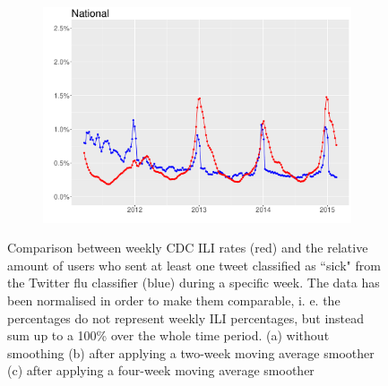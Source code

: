 \documentclass[11pt, a4paper,twoside]{report}\usepackage[]{graphicx}\usepackage[]{color}
\begin{document}
\begin{figure}[H]
  \begin{subfigure}[t]{0.6\textwidth}
  \includegraphics[width=1\linewidth,height=0.5\linewidth]{cdc_twitter_comp_nat_ma4_user.pdf}
  \caption{}
  \end{subfigure}
  \caption{Comparison between weekly CDC ILI rates (red) and the relative amount of users who sent at least one tweet classified as ``sick" from the Twitter flu classifier (blue) during a specific week. The data has been normalised in order to make them comparable, i. e. the percentages do not represent weekly ILI percentages, but instead sum up to a 100\% over the whole time period. (a) without smoothing (b) after applying a two-week moving average smoother (c) after applying a four-week moving average smoother}
  \label{fig:cdc_tw_comp_nat_user}
\end{figure}
\end{document}
